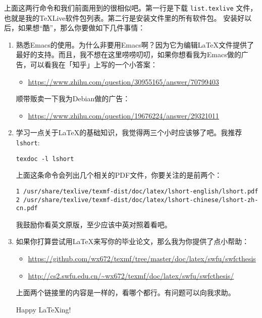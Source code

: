 \documentclass{wx672ctexart}
\begin{document}
上面这两行命令和我们前面用到的很相似吧。第一行是下载 \texttt{list.texlive} 文件，
也就是我的TeXLive软件包列表。第二行是安装文件里的所有软件包。
安装好以后，如果想“酷”，那么你要做如下几件事情：
\begin{enumerate}
\item 熟悉Emacs的使用。为什么非要用Emacs啊？因为它为编辑\LaTeX{}文件提供了最好的支持。而且，我不想在这里唠唠叨叨，如果你想看我为Emacs做的广告，可以看我在「知乎」上写的一个小答案：
\begin{itemize}
\item \url{https://www.zhihu.com/question/30955165/answer/70799403}
\end{itemize}

顺带贩卖一下我为Debian做的广告：
\begin{itemize}
\item \url{https://www.zhihu.com/question/19676224/answer/29321011}
\end{itemize}

\item 学习一点关于\LaTeX{}的基础知识，我觉得两三个小时应该够了吧。我推荐 \texttt{lshort}:
\begin{verbatim}
texdoc -l lshort
\end{verbatim}

上面这条命令会列出几个相关的PDF文件，你要关注的是前两个：
\begin{verbatim}
1 /usr/share/texlive/texmf-dist/doc/latex/lshort-english/lshort.pdf
2 /usr/share/texlive/texmf-dist/doc/latex/lshort-chinese/lshort-zh-cn.pdf
\end{verbatim}

我鼓励你看英文原版，至少应该中英对照着看吧。
\item 如果你打算尝试用\LaTeX{}来写你的毕业论文，那么我为你提供了点小帮助：
\begin{itemize}
\item \url{https://github.com/wx672/texmf/tree/master/doc/latex/swfu/swfcthesis}
\item \url{http://cs2.swfu.edu.cn/\~wx672/texmf/doc/latex/swfu/swfcthesis/}
\end{itemize}
上面两个链接里的内容是一样的，看哪个都行。有问题可以向我求助。

Happy LaTeXing!
\end{enumerate}
\end{document}
